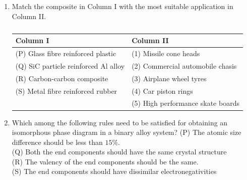 \documentclass[a4paper,10pt]{article}
\begin{document}
\begin{enumerate}
    \item Match the composite in Column I with the most suitable application in Column II.
    \begin{table}[h!] \centering \caption*{} \label{tab:q15_material}
        \begin{tabular}{ll} \hline
            \textbf{Column I} & \textbf{Column II} \\ \hline
            (P) Glass fibre reinforced plastic & (1) Missile cone heads \\
            (Q) SiC particle reinforced Al alloy & (2) Commercial automobile chasis \\
            (R) Carbon-carbon composite & (3) Airplane wheel tyres \\
            (S) Metal fibre reinforced rubber & (4) Car piston rings \\
            & (5) High performance skate boards \\ \hline
        \end{tabular}
    \end{table}
    
    \hfill{}
    \begin{enumerate}
    \end{enumerate}
    
    \item Which among the following rules need to be satisfied for obtaining an isomorphous phase diagram in a binary alloy system?
    (P) The atomic size difference should be less than $15\%$. \\
    (Q) Both the end components should have the same crystal structure \\
    (R) The valency of the end components should be the same. \\
    (S) The end components should have dissimilar electronegativities
    
    \hfill{}
    \begin{enumerate}
    \end{enumerate}
    

\end{enumerate}
\end{document}

